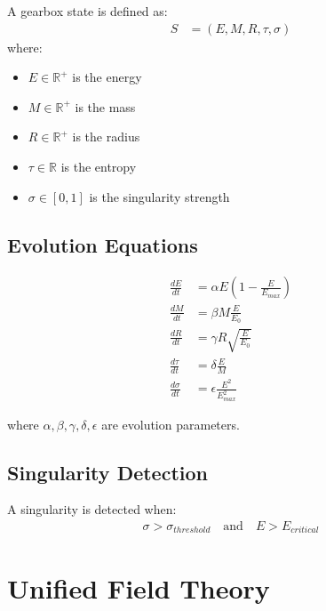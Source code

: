 \documentclass[12pt,a4paper]{article}
\begin{document}
\begin{definition}
A gearbox state is defined as:
\begin{align}
S &= (E, M, R, \tau, \sigma)
\end{align}
where:
\begin{itemize}
\item $E \in \mathbb{R}^+$ is the energy
\item $M \in \mathbb{R}^+$ is the mass
\item $R \in \mathbb{R}^+$ is the radius
\item $\tau \in \mathbb{R}$ is the entropy
\item $\sigma \in [0, 1]$ is the singularity strength
\end{itemize}
\end{definition}

\subsection{Evolution Equations}

\begin{align}
\frac{dE}{dt} &= \alpha E \left(1 - \frac{E}{E_{max}}\right) \\
\frac{dM}{dt} &= \beta M \frac{E}{E_0} \\
\frac{dR}{dt} &= \gamma R \sqrt{\frac{E}{E_0}} \\
\frac{d\tau}{dt} &= \delta \frac{E}{M} \\
\frac{d\sigma}{dt} &= \epsilon \frac{E^2}{E_{max}^2}
\end{align}

where $\alpha, \beta, \gamma, \delta, \epsilon$ are evolution parameters.

\subsection{Singularity Detection}

\begin{definition}
A singularity is detected when:
\begin{align}
\sigma > \sigma_{threshold} \quad \text{and} \quad E > E_{critical}
\end{align}
\end{definition}

\section{Unified Field Theory}
\end{document}
